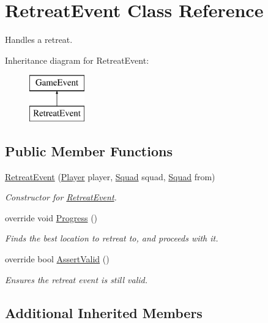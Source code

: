 \hypertarget{class_retreat_event}{}\section{Retreat\+Event Class Reference}
\label{class_retreat_event}


Handles a retreat.  


Inheritance diagram for Retreat\+Event\+:\begin{figure}[H]
\begin{center}
\leavevmode
\includegraphics[height=2.000000cm]{class_retreat_event}
\end{center}
\end{figure}
\subsection*{Public Member Functions}
\begin{DoxyCompactItemize}
\item 
\hyperlink{class_retreat_event_a698bcab87b062b65ad2081ff94b66055}{Retreat\+Event} (\hyperlink{class_player}{Player} player, \hyperlink{class_squad}{Squad} squad, \hyperlink{class_squad}{Squad} from)
\begin{DoxyCompactList}\small\item\em Constructor for \hyperlink{class_retreat_event}{Retreat\+Event}. \end{DoxyCompactList}\item 
override void \hyperlink{class_retreat_event_a3ef1bd850bc58ef3f8e83176be49412f}{Progress} ()
\begin{DoxyCompactList}\small\item\em Finds the best location to retreat to, and proceeds with it. \end{DoxyCompactList}\item 
override bool \hyperlink{class_retreat_event_af91b9bde8576eac93000146daeec411a}{Assert\+Valid} ()
\begin{DoxyCompactList}\small\item\em Ensures the retreat event is still valid. \end{DoxyCompactList}\end{DoxyCompactItemize}
\subsection*{Additional Inherited Members}


